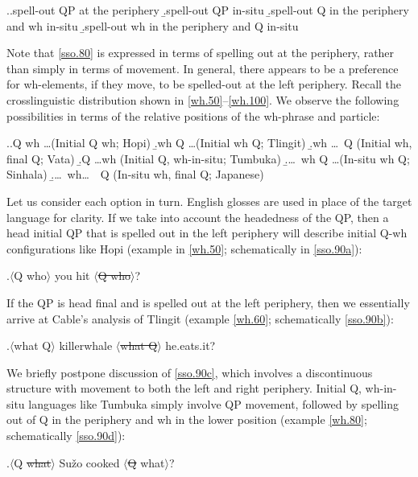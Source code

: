 \documentclass{glossa}
\begin{document}
\ex.\label{sso.80}\a.\label{sso.80a}spell-out QP at the periphery
    \b.\label{sso.80b}spell-out QP in-situ
    \b.\label{sso.80c}spell-out Q in the periphery and wh in-situ
    \b.\label{sso.80d}spell-out wh in the periphery and Q in-situ

Note that \ref{sso.80} is expressed in terms of spelling out at the periphery, rather than simply in terms of movement. In general, there appears to be a preference for wh-elements, if they move, to be spelled-out at the left periphery. Recall the crosslinguistic distribution shown in \ref{wh.50}--\ref{wh.100}. We observe the following possibilities in terms of the relative positions of the wh-phrase and particle:

\ex.\label{sso.90}\a.\label{sso.90a}Q wh \dots  (Initial Q wh; Hopi)
   \b.\label{sso.90b}wh Q \dots  (Initial wh Q; Tlingit)
   \b.\label{sso.90c}wh \dots\ Q (Initial wh, final Q; Vata)
   \b.\label{sso.90d}Q \dots wh (Initial Q, wh-in-situ; Tumbuka)
   \b.\label{sso.90e}\dots\ wh Q \dots (In-situ wh Q; Sinhala)
   \b.\label{sso.90f}\dots\ wh\dots\ \ Q (In-situ wh, final Q; Japanese)

Let us consider each option in turn. English glosses are used in place of the target language for clarity. If we take into account the headedness of the QP, then a head initial QP that is spelled out in the left periphery will describe initial Q-wh configurations like Hopi (example in \ref{wh.50}; schematically in \ref{sso.90a}):

\ex.\label{sso.91}$\langle$Q who$\rangle$ you hit $\langle$\sout{Q who}$\rangle$?

If the QP is head final and is spelled out at the left periphery, then we essentially arrive at Cable's \citeyear{cable:2007} analysis of Tlingit (example \ref{wh.60}; schematically \ref{sso.90b}):

\ex.\label{sso.92}$\langle$what Q$\rangle$ killerwhale $\langle$\sout{what Q}$\rangle$ he.eats.it?

We briefly postpone discussion of \ref{sso.90c}, which involves a discontinuous structure with movement to both the left and right periphery. Initial Q, wh-in-situ languages like Tumbuka simply involve QP movement, followed by spelling out of Q in the periphery and wh in the lower position (example \ref{wh.80}; schematically \ref{sso.90d}):

\ex.\label{sso.93}$\langle$Q \sout{what}$\rangle$ Su\v{z}o cooked $\langle$\sout{Q} what$\rangle$?
\end{document}
